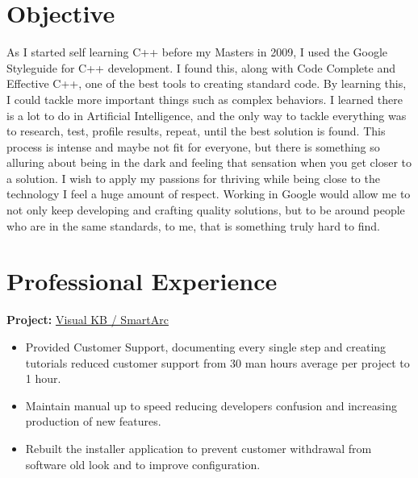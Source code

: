 \documentclass{scrartcl}
\begin{document}
\begin{minipage}[t]{0.69\textwidth}
	\section*{Objective}
		As I started self learning C++ before my Masters in 2009, I used the Google Styleguide for C++ development. I found this, along with Code Complete and Effective C++, one of the best tools to creating standard code. By learning this, I could tackle more important things such as complex behaviors. I learned there is a lot to do in Artificial Intelligence, and the only way to tackle everything was to research, test, profile results, repeat, until the best solution is found. This process is intense and maybe not fit for everyone, but there is something so alluring about being in the dark and feeling that sensation when you get closer to a solution. I wish to apply my passions for thriving while being close to the technology I feel a huge amount of respect. Working in Google would allow me to not only keep developing and crafting quality solutions, but to be around people who are in the same standards, to me, that is something truly hard to find.  
		
\section*{Professional Experience}
	
	\textbf{Project:} \href{http://amige.com/meltshops_technological_controls_smartarc.html}{Visual KB / SmartArc}
	\begin{itemize}[noitemsep]
		\item Provided Customer Support, documenting every single step and creating tutorials reduced customer support from 30 man hours average per project to 1 hour.
		\item Maintain manual up to speed reducing developers confusion and increasing production of new features.
		\item Rebuilt the installer application to prevent customer withdrawal from software old look and to improve configuration. 
	\end{itemize}
	

\end{minipage}
\end{document}
